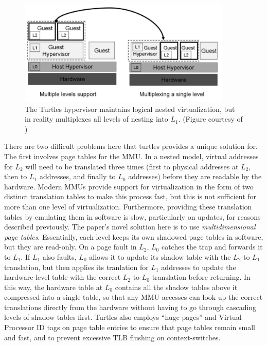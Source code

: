 \documentclass[letterpaper, twocolumn]{article}
\begin{document}
\begin{figure}[t]
	\begin{center}
		\includegraphics[width=4in]{images/turtles.png}
	\end{center}
	\caption{The Turtles hypervisor maintains logical nested virtualization, but
		in reality multiplexes all levels of nesting into $L_1$. (Figure courtesy
		of \cite{ref:turtles})}
	\label{fig:turtles-multiplex}
\end{figure}

There are two difficult problems here that turtles provides a unique solution for.
The first involves page tables for the MMU.  In a nested model, virtual addresses for $L_2$
will need to be translated three times (first to physical addresses at $L_2$, then to $L_1$
addresses, and finally to $L_0$ addresses)
before they are readable by the hardware.  Modern MMUs provide support for virtualization
in the form of two distinct translation tables to make this process fast, but this is not
sufficient for more than one level of virtualization.  Furthermore, providing these
translation tables by emulating them in software is slow, particularly on updates,
for reasons described previously.  The paper's novel solution here is to use
\emph{multidimensional page tables}.  Essentially, each level keeps its own
shadowed page tables in software, but they are read-only.  On a page fault in $L_2$,
$L_0$ catches the trap and forwards it to $L_1$.  If $L_1$ also faults, $L_0$ allows
it to update its shadow table with the $L_2$-to-$L_1$ translation, but then applies
its tranlation for $L_1$ addresses to update the hardware-level table with the correct
$L_2$-to-$L_0$ translation before returning.  In this way, the hardware table at $L_0$
contains all the shadow tables above it compressed into a single table, so that
any MMU accesses can look up the correct translations directly from the hardware
without having to go through cascading levels of shadow tables first.  Turtles
also employs ``huge pages'' and Virtual Processor ID tags on page table entries
to ensure that page tables remain small and fast, and to prevent excessive TLB
flushing on context-switches.
\end{document}
